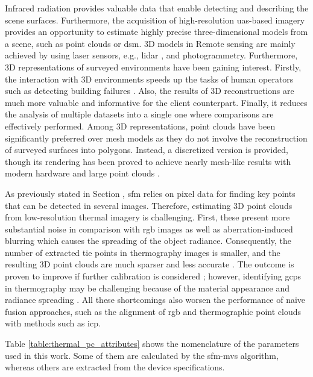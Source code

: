 Infrared radiation provides valuable data that enable detecting and describing the scene surfaces. Furthermore, the acquisition of high-resolution \acrshort{uas}-based imagery provides an opportunity to estimate highly precise three-dimensional models from a scene, such as point clouds or \acrshort{dsm}. 3D models in Remote sensing are mainly achieved by using laser sensors, e.g., \acrshort{lidar} \cite{yandun_narvaez_survey_2017}, and photogrammetry. Furthermore, 3D representations of surveyed environments have been gaining interest. Firstly, the interaction with 3D environments speeds up the tasks of human operators such as detecting building failures \cite{lin_fusion_2019}. Also, the results of 3D reconstructions are much more valuable and informative for the client counterpart. Finally, it reduces the analysis of multiple datasets into a single one where comparisons are effectively performed. Among 3D representations, point clouds have been significantly preferred over mesh models as they do not involve the reconstruction of surveyed surfaces \cite{park_comparison_2019} into polygons. Instead, a discretized version is provided, though its rendering has been proved to achieve nearly mesh-like results with modern hardware and large point clouds \cite{schutz_rendering_2021}.   

As previously stated in Section , \acrshort{sfm} relies on pixel data for finding key points that can be detected in several images. Therefore, estimating 3D point clouds from low-resolution thermal imagery is challenging. First, these present more substantial noise in comparison with \acrshort{rgb} images \cite{sledz_thermal_2018} as well as aberration-induced blurring which causes the spreading of the object radiance. Consequently, the number of extracted tie points in thermography images is smaller, and the resulting 3D point clouds are much sparser and less accurate \cite{jarzabek-rychard_supervised_2020}. The outcome is proven to improve if further calibration is considered \cite{ribeiro-gomes_uncooled_2017}; however, identifying \acrshort{gcp}s in thermography may be challenging because of the material appearance and radiance spreading \cite{javadnejad_photogrammetric_2020}. All these shortcomings also worsen the performance of naive fusion approaches, such as the alignment of \acrshort{rgb} and thermographic point clouds with methods such as \acrshort{icp}. 

Table \ref{table:thermal_pc_attributes} shows the nomenclature of the parameters used in this work. Some of them are calculated by the \acrshort{sfm}-\acrshort{mvs} algorithm, whereas others are extracted from the device specifications.

